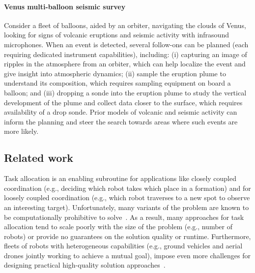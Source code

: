 \documentclass[conference]{IEEEtran}
\begin{document}
\paragraph{Venus multi-balloon seismic survey} Consider a fleet of balloons, aided by an orbiter, navigating the clouds of Venus, looking for signs of volcanic eruptions and seismic activity with infrasound microphones. When an event is detected, several follow-ons can be planned (each requiring dedicated instrument capabilities), including: (i) capturing an image of ripples in the atmosphere from an orbiter, which can help localize the event and give insight into atmospheric dynamics; (ii) sample the eruption plume to understand its composition, which requires sampling equipment on board a balloon; and (iii) dropping a sonde into the eruption plume to study the vertical development of the plume and collect data closer to the surface, which requires availability of a drop sonde. Prior models of volcanic and seismic activity can inform the planning and steer the search towards areas where such events are more likely.

\subsection{Related work}
Task allocation is an enabling subroutine for applications like closely coupled coordination (e.g., deciding which robot takes which place in a formation) and for loosely coupled coordination (e.g., which robot traverses to a new spot to observe an interesting target). Unfortunately, many variants of the problem are known to be computationally prohibitive to solve~\cite{GerkeyMataric04,KorashETAL13}. As a result, many approaches for task allocation tend to scale poorly with the size of the problem (e.g., number of robots) or provide no guarantees on the solution quality or runtime. Furthermore, fleets of robots with heterogeneous capabilities (e.g., ground vehicles and aerial drones jointly working to achieve a mutual goal), impose even more challenges for designing practical high-quality solution approaches~\cite{BaiETAL20,AgatzETAL18,FerrandezETAL16,MurrayChu15,Wang2017}. 
\end{document}

